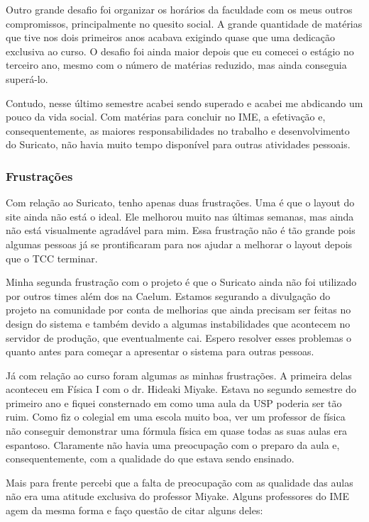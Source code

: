 \documentclass[titlepage,a4paper]{article}
\newcommand{\suricato}{Suricato}
\begin{document}
Outro grande desafio foi organizar os horários da faculdade com os meus outros compromissos, principalmente no quesito social. A grande quantidade de matérias que tive nos dois primeiros anos acabava exigindo quase que uma dedicação exclusiva ao curso. O desafio foi ainda maior depois que eu comecei o estágio no terceiro ano, mesmo com o número de matérias reduzido, mas ainda conseguia superá-lo.

Contudo, nesse último semestre acabei sendo superado e acabei me abdicando um pouco da vida social. Com matérias para concluir no IME, a efetivação e, consequentemente, as maiores responsabilidades no trabalho e desenvolvimento do \suricato{}, não havia muito tempo disponível para outras atividades pessoais.

\subsubsection*{Frustrações}

Com relação ao \suricato{}, tenho apenas duas frustrações. Uma é que o layout do site ainda não está o ideal. Ele melhorou muito nas últimas semanas, mas ainda não está visualmente agradável para mim. Essa frustração não é tão grande pois algumas pessoas já se prontificaram para nos ajudar a melhorar o layout depois que o TCC terminar.

Minha segunda frustração com o projeto é que o \suricato{} ainda não foi utilizado por outros times além dos na Caelum. Estamos segurando a divulgação do projeto na comunidade por conta de melhorias que ainda precisam ser feitas no design do sistema e também devido a algumas instabilidades que acontecem no servidor de produção, que eventualmente cai. Espero resolver esses problemas o quanto antes para começar a apresentar o sistema para outras pessoas.

Já com relação ao curso foram algumas as minhas frustrações.  A primeira delas aconteceu em Física I com o dr. Hideaki Miyake. Estava no segundo semestre do primeiro ano e fiquei consternado em como uma aula da USP poderia ser tão ruim. Como fiz o colegial em uma escola muito boa, ver um professor de física não conseguir demonstrar uma fórmula física em quase todas as suas aulas era espantoso. Claramente não havia uma preocupação com o preparo da aula e, consequentemente, com a qualidade do que estava sendo ensinado.

Mais para frente percebi que a falta de preocupação com as qualidade das aulas não era uma atitude exclusiva do professor Miyake. Alguns professores do IME agem da mesma forma e faço questão de citar alguns deles:
\end{document}

